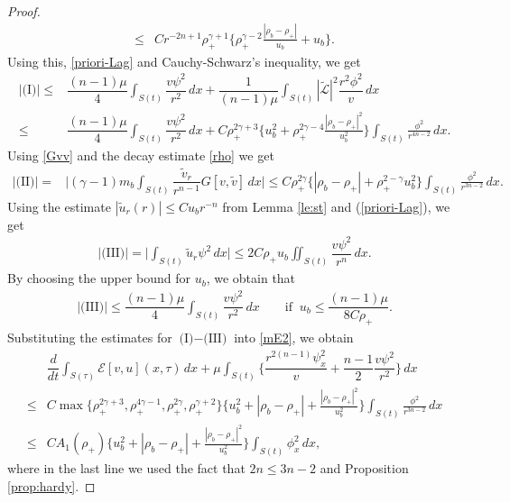 \documentclass[a4paper,12pt,draft]{article}
\theoremstyle{remark}
\def\ut{\tilde{u}}
\def\vt{\tilde{v}}
\def\mE{\mathcal{E}}
\def\mL{\mathcal{L}}
\begin{document}
\begin{proof}
\begin{align*}
    \le & C r^{-2n+1} \rho_{+}^{\gamma+1} \Big\{ \rho_{+}^{\gamma-2}\frac{|\rho_b-\rho_{+}|}{u_b} +  u_b \Big\}. 
\end{align*}
Using this, \eqref{priori-Lag} and Cauchy-Schwarz's inequality, we get
\begin{align*}
    | \textrm{(I)} | \le& \dfrac{(n-1)\mu}{4} \int_{S(t)} \dfrac{v \psi^2}{r^2} \, dx  + \dfrac{1}{(n-1)\mu} \int_{S(t)} |\tilde{\mL}|^2\dfrac{r^2\phi^2}{v}\, dx \\
    \le& \dfrac{(n-1)\mu}{4} \int_{S(t)} \dfrac{v \psi^2}{r^2} \, dx + C \rho_{+}^{2\gamma+3} \Big\{ u_b^2 + \rho_{+}^{2\gamma-4} \frac{|\rho_b-\rho_+|^2}{u_b^2}\Big\} \int_{S(t)} \frac{\phi^2}{r^{4n-2}}\, dx.
\end{align*}
Using \eqref{Gvv} and the decay estimate \eqref{rho} we get
\begin{align*}
    |\textrm{(II)}| =& \Big|  (\gamma-1)m_b \int_{S(t)} \dfrac{\vt_r}{r^{n-1}} G[v,\vt] \, d x\Big| 
    \le C \rho_{+}^{2\gamma}\big\{ |\rho_b-\rho_+| + \rho_{+}^{2-\gamma} u_b^2 \big\}\int_{S(t)} \frac{\phi^2}{r^{3n-2}}\, dx.
\end{align*}
Using the estimate $|\ut_r(r)|\le C u_b r^{-n}$ from Lemma \ref{le:st} and (\ref{priori-Lag}), we get
\begin{align*}
    |\textrm{(III)}| = \Big| \int_{S(t)} \ut_r \psi^2 \, dx \Big| \le 2 C \rho_+ u_b \iint_{S(t)} \dfrac{v \psi^2}{r^n}\, dx.
\end{align*}
By choosing the upper bound for $u_b$, we obtain that
\begin{align*}
    |\textrm{(III)}| \le \dfrac{(n-1)\mu}{4}\int_{S(t)} \dfrac{v \psi^2}{r^2}\, dx \qquad \text{if } \ u_b \le \dfrac{(n-1)\mu}{8 C \rho_+}.
\end{align*}
Substituting the estimates for $\textrm{(I)}-\textrm{(III)}$ into \eqref{mE2}, we obtain
\begin{align*}
    &\dfrac{d}{d t}\int_{S(\tau)}\!\! \mE[v,u](x,\tau) \, dx + \mu\int_{S(t)}\!\!\Big\{ \dfrac{r^{2(n-1)}\psi_x^2}{v} + \dfrac{n-1}{2} \dfrac{v \psi^2}{r^2} \Big\}\, dx \\ 
    \le&   C \max\{ \rho_+^{2\gamma+3}, \rho_{+}^{4\gamma-1}, \rho_{+}^{2\gamma}, \rho_{+}^{\gamma+2} \} \Big\{ u_b^2 + |\rho_b-\rho_+| +\frac{|\rho_b-\rho_+|^2}{u_b^2} \Big\} \int_{S(t)} \frac{\phi^2}{r^{3n-2}}\, dx\\
    \le&  C A_1(\rho_{+}) \Big\{ u_b^2+ |\rho_b-\rho_{+}| +\frac{|\rho_b-\rho_+|^2}{u_b^2} \Big\} \int_{S(t)}\!\! \phi_x^2\, dx, 
\end{align*}
where in the last line we used the fact that $2n \le 3n-2$ and Proposition \ref{prop:hardy}.
\end{proof}
\end{document}
